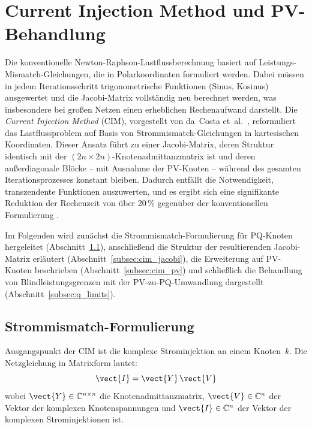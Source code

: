 \section{Current Injection Method und PV-Behandlung}\label{sec:cim}

Die konventionelle Newton-Raphson-Lastflussberechnung basiert auf Leistungs-Mismatch-Gleichungen, 
die in Polarkoordinaten formuliert werden. Dabei müssen in jedem Iterationsschritt 
trigonometrische Funktionen (Sinus, Kosinus) ausgewertet und die Jacobi-Matrix vollständig 
neu berechnet werden, was insbesondere bei großen Netzen einen erheblichen Rechenaufwand 
darstellt. Die \textit{Current Injection Method} (CIM), vorgestellt von da~Costa et~al.\ 
\cite{DaCosta1999}, reformuliert das Lastflussproblem auf Basis von Strommismatch-Gleichungen 
in kartesischen Koordinaten. Dieser Ansatz führt zu einer Jacobi-Matrix, deren Struktur 
identisch mit der $(2n \times 2n)$-Knotenadmittanzmatrix ist und deren außerdiagonale Blöcke 
-- mit Ausnahme der PV-Knoten -- während des gesamten Iterationsprozesses konstant bleiben. 
Dadurch entfällt die Notwendigkeit, transzendente Funktionen auszuwerten, und es ergibt 
sich eine signifikante Reduktion der Rechenzeit von über 20\,\% gegenüber der konventionellen 
Formulierung \cite{DaCosta1999}.

Im Folgenden wird zunächst die Strommismatch-Formulierung für PQ-Knoten hergeleitet 
(Abschnitt~\ref{subsec:cim_grundgleichung}), anschließend die Struktur der resultierenden 
Jacobi-Matrix erläutert (Abschnitt~\ref{subsec:cim_jacobi}), die Erweiterung auf PV-Knoten 
beschrieben (Abschnitt~\ref{subsec:cim_pv}) und schließlich die Behandlung von 
Blindleistungsgrenzen mit der PV-zu-PQ-Umwandlung dargestellt 
(Abschnitt~\ref{subsec:q_limits}).

\subsection{Strommismatch-Formulierung}\label{subsec:cim_grundgleichung}

Ausgangspunkt der CIM ist die komplexe Strominjektion an einem Knoten~$k$. Die 
Netzgleichung in Matrixform lautet:
\begin{equation}
	\vect{I} = \vect{Y} \, \vect{V}
	\label{eq:netzgleichung}
\end{equation}
wobei $\vect{Y} \in \mathbb{C}^{n \times n}$ die Knotenadmittanzmatrix, 
$\vect{V} \in \mathbb{C}^{n}$ der Vektor der komplexen Knotenspannungen und 
$\vect{I} \in \mathbb{C}^{n}$ der Vektor der komplexen Strominjektionen ist.

